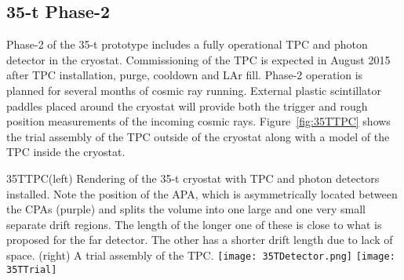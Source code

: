 \subsection{35-t Phase-2}
\label{sec:proto-35t-ph2}

Phase-2 of the 35-t prototype includes a fully operational TPC and
photon detector in the cryostat.  Commissioning of the TPC is expected
in August 2015 after TPC installation, purge, cooldown and LAr fill.
Phase-2 operation is planned for several months of cosmic ray running.
External plastic scintillator paddles placed around the cryostat will
provide both the trigger and rough position measurements of the
incoming cosmic rays.  Figure~\ref{fig:35TTPC} shows the trial
assembly of the TPC outside of the cryostat along with a model of the
TPC inside the cryostat.
\begin{cdrfigure}{35TTPC}{(left) Rendering of the
35-t cryostat with TPC and photon detectors installed.  Note the
position of the APA, which is asymmetrically located between the CPAs
(purple) and splits the volume into one large and one very small %
separate drift regions.  The length of the longer one of these is
close to what is proposed for the far detector.  The other has a
shorter drift length due to lack of space.  (right) A trial assembly
of the TPC.  } \texttt{[image: 35TDetector.png]}
  \texttt{[image: 35TTrial]}
\end{cdrfigure}

